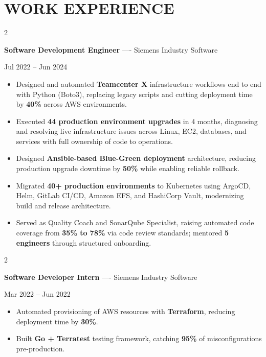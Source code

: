 \documentclass[10pt, letterpaper]{article}
\newenvironment{highlights}{
    \begin{itemize}[
        topsep=0.10 cm,
        parsep=0.06 cm,
        partopsep=0pt,
        itemsep=0.06 cm,
        leftmargin=12pt
    ]
}{
    \end{itemize}
}
\newenvironment{twocolentry}[2][]{
    \onecolentry
    \def\secondColumn{#2}
    \setcolumnwidth{\fill, 4.5 cm}
    \begin{paracol}{2}
}{
    \switchcolumn \raggedleft \secondColumn
    \end{paracol}
    \endonecolentry
}
\begin{document}
\section{WORK EXPERIENCE}
\begin{twocolentry}{Jul 2022 -- Jun 2024}
\textbf{Software Development Engineer} ---- Siemens Industry Software
\end{twocolentry}
\begin{highlights}
  \item Designed and automated \textbf{Teamcenter X} infrastructure workflows end to end with Python (Boto3), replacing legacy scripts and cutting deployment time by \textbf{40\%} across AWS environments.
  \item Executed \textbf{44 production environment upgrades} in 4 months, diagnosing and resolving live infrastructure issues across Linux, EC2, databases, and services with full ownership of code to operations.
  \item Designed \textbf{Ansible-based Blue-Green deployment} architecture, reducing production upgrade downtime by \textbf{50\%} while enabling reliable rollback.
  \item Migrated \textbf{40+ production environments} to Kubernetes using ArgoCD, Helm, GitLab CI/CD, Amazon EFS, and HashiCorp Vault, modernizing build and release architecture.
  \item Served as Quality Coach and SonarQube Specialist, raising automated code coverage from \textbf{35\% to 78\%} via code review standards; mentored \textbf{5 engineers} through structured onboarding.
\end{highlights}

\vspace{0.15 cm}

\begin{twocolentry}{Mar 2022 -- Jun 2022}
\textbf{Software Developer Intern} ---- Siemens Industry Software
\end{twocolentry}
\begin{highlights}
  \item Automated provisioning of AWS resources with \textbf{Terraform}, reducing deployment time by \textbf{30\%}.
  \item Built \textbf{Go + Terratest} testing framework, catching \textbf{95\%} of misconfigurations pre-production.
\end{highlights}

\vspace{0.15 cm}
\end{document}
